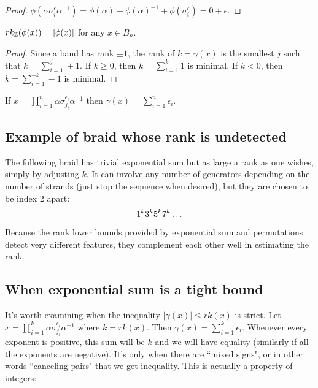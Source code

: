 \documentclass[12pt]{thesis}
\begin{document}
\begin{proof}
$\phi(\alpha \sigma_{i}^{\epsilon}\alpha^{-1}) = \phi(\alpha) + \phi(\alpha)^{-1} + \phi(\sigma_{i}^{\epsilon}) = 0 + \epsilon$.
\end{proof}

\begin{corollary}
    $rk_{\mathbb{Z}}(\phi(x)) = |\phi(x)|$ for any $x \in B_{n}$.
\end{corollary}

\begin{proof}
    Since a band has rank $\pm 1$, the rank of $k = \gamma(x)$ is 
    the smallest $j$ such that $k = \sum_{i=1}^{j} \pm 1$.
    If $k \geq 0$, then $k = \sum_{i=1}^{k} 1$ is minimal.
    If $k < 0$, then $k = \sum_{i=1}^{-k} -1$ is minimal.
\end{proof}

\begin{corollary}
    If $x = \prod_{i = 1}^{n} \alpha \sigma_{j_{i}}^{\epsilon_{i}}\alpha^{-1}$
    then $\gamma(x) = \sum_{i=1}^{n} \epsilon_{i}$.
\end{corollary}

\subsection{Example of braid whose rank is undetected}

The following braid has trivial exponential sum
but as large a rank as one wishes, simply by adjusting
$k$.
It can involve any number of generators depending
on the number of strands (just stop the sequence when desired),
but they are chosen to be index 2 apart:
\[
    \bar{1}^{k} 3^{k} \bar{5}^{k} 7^{k} \ldots 
\]
Because the rank lower bounds provided by exponential sum and permutations
detect very different features,
they complement each other well in estimating the rank.

\subsection{When exponential sum is a tight bound}

It's worth examining when the inequality $|\gamma(x)| \leq rk(x)$ is strict.
Let $x = \prod_{i = 1}^{k} \alpha\sigma_{j_{i}}^{\epsilon_{i}}\alpha^{-1}$ 
where $k = rk(x)$.
Then $\gamma(x) = \sum_{i=1}^{k} \epsilon_{i}$.
Whenever every exponent is positive, this sum will be $k$ and we will have equality
(similarly if all the exponents are negative).
It's only when there are ``mixed signs",
or in other words ``canceling pairs" that we get inequality.
This is actually a property of integers:
\end{document}
